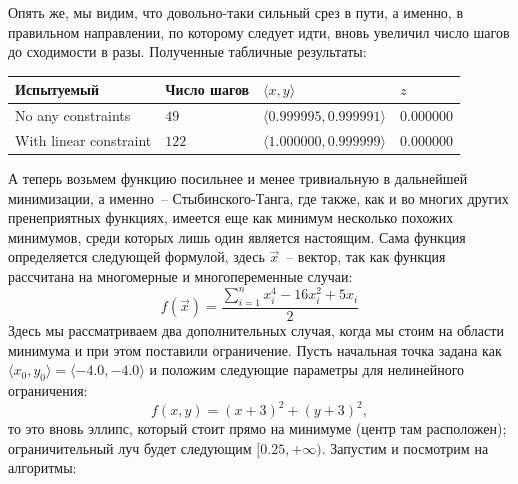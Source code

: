 \documentclass[12pt, a4paper, oneside, final]{article}
\begin{document}
	Опять же, мы видим, что довольно-таки сильный срез в пути, а именно, в правильном направлении, по которому следует идти, вновь увеличил число шагов до сходимости в разы.
	Полученные табличные результаты:
	\begin{table}[H]
		\centering
		\begin{tabular}{l|l|l|l}
			Испытуемый & Число шагов & $\langle x, y \rangle$ & $z$ \\ \hline
			No any constraints & $49$ & $\langle 0.999995,   0.999991 \rangle$ & $0.000000$ \\
			With linear constraint & $122$ & $\langle 1.000000,   0.999999 \rangle$ & $0.000000$
		\end{tabular}
	\end{table}

	А теперь возьмем функцию посильнее и менее тривиальную в дальнейшей минимизации, а именно~-- Стыбинского-Танга, где также, как и во многих других пренеприятных функциях, имеется еще как минимум несколько похожих минимумов, среди которых лишь один является настоящим.
	Сама функция определяется следующей формулой, здесь $\vec{x}$~-- вектор, так как функция рассчитана на многомерные и многопеременные случаи:
	\[
		f(\vec{x}) = \dfrac{\sum\limits_{i = 1}^{n}{x_{i}^{4} - 16x_{i}^{2} + 5x_{i}}}{2}
	\]
	Здесь мы рассматриваем два дополнительных случая, когда мы стоим на области минимума и при этом поставили ограничение.
	Пусть начальная точка задана как $\langle x_0, y_0 \rangle = \langle -4.0, -4.0 \rangle$ и положим следующие параметры для нелинейного ограничения:
	\[
		f(x, y) = (x + 3)^2 + (y + 3)^2,
	\] то это вновь эллипс, который стоит прямо на минимуме (центр там расположен); ограничительный луч будет следующим $[0.25, +\infty)$.
	Запустим и посмотрим на алгоритмы:
\end{document}
